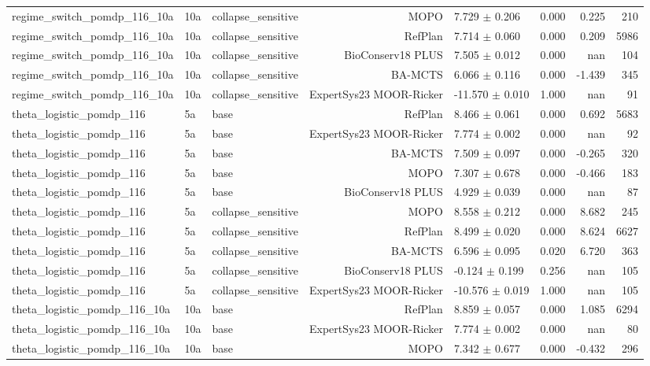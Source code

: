 \documentclass{article}
\begin{document}
\begin{longtable}{lllrlrrr}
regime\_switch\_pomdp\_116\_10a & 10a & collapse\_sensitive & MOPO & 7.729 $\pm$ 0.206 & 0.000 & 0.225 & 210 \\
regime\_switch\_pomdp\_116\_10a & 10a & collapse\_sensitive & RefPlan & 7.714 $\pm$ 0.060 & 0.000 & 0.209 & 5986 \\
regime\_switch\_pomdp\_116\_10a & 10a & collapse\_sensitive & BioConserv18 PLUS & 7.505 $\pm$ 0.012 & 0.000 & nan & 104 \\
regime\_switch\_pomdp\_116\_10a & 10a & collapse\_sensitive & BA-MCTS & 6.066 $\pm$ 0.116 & 0.000 & -1.439 & 345 \\
regime\_switch\_pomdp\_116\_10a & 10a & collapse\_sensitive & ExpertSys23 MOOR-Ricker & -11.570 $\pm$ 0.010 & 1.000 & nan & 91 \\
theta\_logistic\_pomdp\_116 & 5a & base & RefPlan & 8.466 $\pm$ 0.061 & 0.000 & 0.692 & 5683 \\
theta\_logistic\_pomdp\_116 & 5a & base & ExpertSys23 MOOR-Ricker & 7.774 $\pm$ 0.002 & 0.000 & nan & 92 \\
theta\_logistic\_pomdp\_116 & 5a & base & BA-MCTS & 7.509 $\pm$ 0.097 & 0.000 & -0.265 & 320 \\
theta\_logistic\_pomdp\_116 & 5a & base & MOPO & 7.307 $\pm$ 0.678 & 0.000 & -0.466 & 183 \\
theta\_logistic\_pomdp\_116 & 5a & base & BioConserv18 PLUS & 4.929 $\pm$ 0.039 & 0.000 & nan & 87 \\
theta\_logistic\_pomdp\_116 & 5a & collapse\_sensitive & MOPO & 8.558 $\pm$ 0.212 & 0.000 & 8.682 & 245 \\
theta\_logistic\_pomdp\_116 & 5a & collapse\_sensitive & RefPlan & 8.499 $\pm$ 0.020 & 0.000 & 8.624 & 6627 \\
theta\_logistic\_pomdp\_116 & 5a & collapse\_sensitive & BA-MCTS & 6.596 $\pm$ 0.095 & 0.020 & 6.720 & 363 \\
theta\_logistic\_pomdp\_116 & 5a & collapse\_sensitive & BioConserv18 PLUS & -0.124 $\pm$ 0.199 & 0.256 & nan & 105 \\
theta\_logistic\_pomdp\_116 & 5a & collapse\_sensitive & ExpertSys23 MOOR-Ricker & -10.576 $\pm$ 0.019 & 1.000 & nan & 105 \\
theta\_logistic\_pomdp\_116\_10a & 10a & base & RefPlan & 8.859 $\pm$ 0.057 & 0.000 & 1.085 & 6294 \\
theta\_logistic\_pomdp\_116\_10a & 10a & base & ExpertSys23 MOOR-Ricker & 7.774 $\pm$ 0.002 & 0.000 & nan & 80 \\
theta\_logistic\_pomdp\_116\_10a & 10a & base & MOPO & 7.342 $\pm$ 0.677 & 0.000 & -0.432 & 296 \\

\end{longtable}
\end{document}
